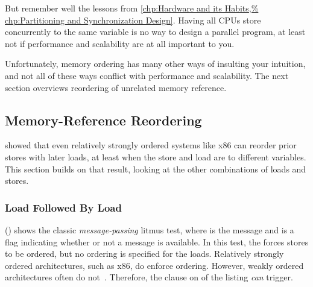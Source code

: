 But remember well the lessons from
\cref{chp:Hardware and its Habits,%
chp:Partitioning and Synchronization Design}.
Having all CPUs store concurrently to the same variable
is no way to design a parallel program, at least
not if performance and scalability are at all important to you.

Unfortunately, memory ordering has many other ways of insulting your
intuition, and not all of these ways conflict with performance and
scalability.
The next section overviews reordering of unrelated memory reference.

\subsection{Memory-Reference Reordering}
\label{sec:memorder:Memory-Reference Reordering}

showed that even relatively strongly ordered systems like x86
can reorder prior stores with later loads, at least when the
store and load are to different variables.
This section builds on that result, looking at the other combinations of
loads and stores.

\begin{listing}

\caption{Message-Passing Litmus Test (No Ordering)}
\label{lst:memorder:Message-Passing Litmus Test (No Ordering)}
\end{listing}

\subsubsection{Load Followed By Load}
\label{sec:memorder:Load Followed By Load}

\begin{fcvref}
()
shows the classic \emph{message-passing} litmus test, where  is
the message and  is a flag indicating whether or not a message
is available.
In this test, the  forces  stores to be ordered,
but no ordering is specified for the loads.
Relatively strongly ordered architectures, such as x86, do enforce ordering.
However, weakly ordered architectures often do
not~\cite{JadeAlglave2011ppcmem}.
Therefore, the  clause on  of the listing \emph{can}
trigger.
\end{fcvref}

